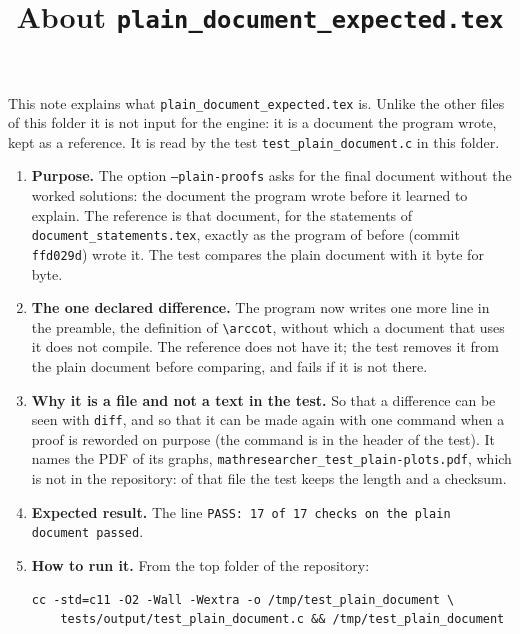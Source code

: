 \documentclass[11pt,a4paper]{article}
\title{About \texttt{plain\_document\_expected.tex}}
\author{}
\date{}
\begin{document}
\maketitle
This note explains what \texttt{plain\_document\_expected.tex} is. Unlike the other files of this folder it is not input for the engine: it is a document the program wrote, kept as a reference. It is read by the test \texttt{test\_plain\_document.c} in this folder.

\begin{enumerate}
\item \textbf{Purpose.} The option \texttt{--plain-proofs} asks for the final document without the worked solutions: the document the program wrote before it learned to explain. The reference is that document, for the statements of \texttt{document\_statements.tex}, exactly as the program of before (commit \texttt{ffd029d}) wrote it. The test compares the plain document with it byte for byte.

\item \textbf{The one declared difference.} The program now writes one more line in the preamble, the definition of \texttt{\textbackslash arccot}, without which a document that uses it does not compile. The reference does not have it; the test removes it from the plain document before comparing, and fails if it is not there.

\item \textbf{Why it is a file and not a text in the test.} So that a difference can be seen with \texttt{diff}, and so that it can be made again with one command when a proof is reworded on purpose (the command is in the header of the test). It names the PDF of its graphs, \texttt{mathresearcher\_test\_plain-plots.pdf}, which is not in the repository: of that file the test keeps the length and a checksum.

\item \textbf{Expected result.} The line \texttt{PASS: 17 of 17 checks on the plain document passed}.

\item \textbf{How to run it.} From the top folder of the repository:
\begin{verbatim}
cc -std=c11 -O2 -Wall -Wextra -o /tmp/test_plain_document \
    tests/output/test_plain_document.c && /tmp/test_plain_document
\end{verbatim}
\end{enumerate}
\end{document}
